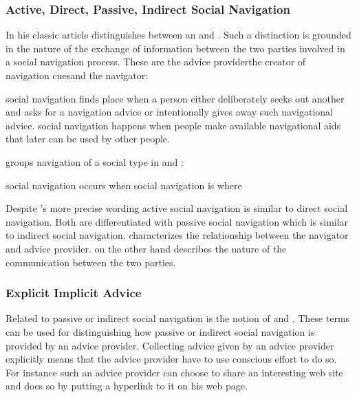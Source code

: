 \subsubsection{Active, Direct, Passive, \oldand Indirect Social Navigation}

In his classic article \citet{dieberger97} distinguishes between an
 and .
Such a distinction is grounded in the nature of the exchange of information
between the two parties involved in a social navigation process.
These are the advice provider\dash{}the creator of navigation
cues\dash{}and the navigator:

\begin{items}
   social navigation finds place when a person either
    deliberately seeks out another and asks for a navigation advice or
    intentionally gives away such navigational advice.
   social navigation happens when people make available
    navigational aids that later can be used by other people.
\end{items}

\citeauthor{svensson03} groups navigation of a social type in
 and :

\begin{items}
   social navigation occurs when
   social navigation is where
\end{items}

Despite \citeauthor{svensson03}'s more precise wording active social
navigation is similar to direct social navigation. Both are differentiated
with passive social navigation which is similar to indirect social navigation.
\citeauthor{dieberger97} characterizes the relationship between the
navigator and advice provider. \citeauthor{svensson03} on the other hand
describes the nature of the communication between the two parties.

\subsubsection{Explicit \oldand Implicit Advice}

Related to passive or indirect social navigation is the notion
of  and .
These terms can be used for distinguishing how
passive or indirect social navigation is provided by an advice provider.
Collecting advice given by an advice provider explicitly means that
the advice provider have to use conscious effort to do so. For instance such
an advice provider can choose to share an interesting web site and does so by
putting a hyperlink to it on his web page.

